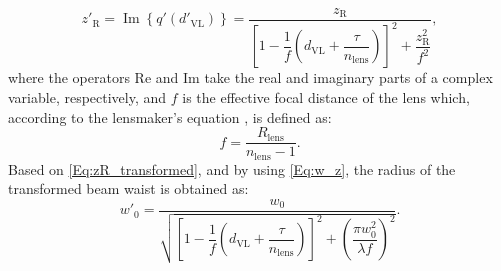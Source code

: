 \documentclass[lettersize,journal]{IEEEtran}
\begin{document}
%
\begin{equation} \label{Eq:zR_transformed}
    z'_\mathrm{R} = \operatorname{Im}\left\{q'(d'_\mathrm{VL})\right\} = \frac{z_\mathrm{R}}{\left[1-\dfrac{1}{f}\left(d_\mathrm{VL}+\dfrac{\tau}{n_\mathrm{lens}}\right)\right]^2+\dfrac{z_\mathrm{R}^2}{f^2}},
\end{equation}
%
where the operators $\mathrm{Re}$ and $\mathrm{Im}$ take the real and imaginary parts of a complex variable, respectively, and $f$ is the effective focal distance of the lens which, according to the lensmaker's equation \cite[p.~249]{Hecht2017Optics}, is defined as: 
\begin{equation}
    f = \frac{R_\mathrm{lens}}{n_\mathrm{lens}-1}.
\end{equation} 
Based on \eqref{Eq:zR_transformed}, and by using \eqref{Eq:w_z}, the radius of the transformed beam waist is obtained as:
%
\begin{equation}
w'_0 = \frac{w_0}{\sqrt{\left[1-\dfrac{1}{f}\left(d_\mathrm{VL}+\dfrac{\tau}{n_\mathrm{lens}}\right)\right]^2+\left(\dfrac{\pi w_0^2}{\lambda f}\right)^{\!2}}}.
\label{Eq:w0_transformed}
\end{equation}

\vspace{-10pt}

\end{document}
